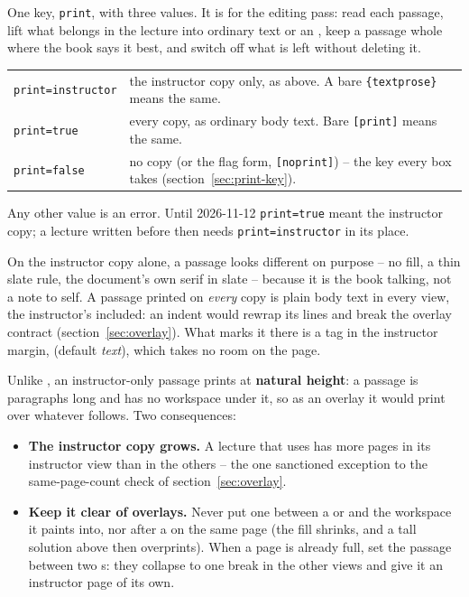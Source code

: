 One key, \texttt{print}, with three values. It is for the editing pass:
read each passage, lift what belongs in the lecture into ordinary text or an
, keep a passage whole where the book says it best, and
switch off what is left without deleting it.

\begin{center}
\begin{tabularx}{\linewidth}{@{}l Y@{}}
\texttt{print=instructor} & the instructor copy only, as above. A bare
  \texttt{\{textprose\}} means the same.\\
\texttt{print=true} & every copy, as ordinary body text. Bare
  \texttt{[print]} means the same.\\
\texttt{print=false} & no copy (or the flag form, \texttt{[noprint]}) -- the
  key every box takes (section~\ref{sec:print-key}).\\
\end{tabularx}
\end{center}

\noindent Any other value is an error. Until 2026-11-12 \texttt{print=true}
meant the instructor copy; a lecture written before then needs
\texttt{print=instructor} in its place.

On the instructor copy alone, a passage looks different on purpose -- no
fill, a thin slate rule, the document's own serif in slate -- because it is
the book talking, not a note to self. A passage printed on \emph{every} copy
is plain body text in every view, the instructor's included: an indent would
rewrap its lines and break the overlay contract (section~\ref{sec:overlay}).
What marks it there is a tag in the instructor margin, 
(default \emph{text}), which takes no room on the page.

Unlike , an instructor-only passage prints at \textbf{natural height}: a passage is
paragraphs long and has no workspace under it, so as an overlay it would print
over whatever follows. Two consequences:

\begin{itemize}
  \item \textbf{The instructor copy grows.} A lecture that uses 
    has more pages in its instructor view than in the others -- the one
    sanctioned exception to the same-page-count check of
    section~\ref{sec:overlay}.
  \item \textbf{Keep it clear of overlays.} Never put one between a
     or  and the workspace it paints into,
    nor after a  on the same page (the fill shrinks, and a tall
    solution above then overprints). When a page is already full, set the
    passage between two s: they collapse to one break in the
    other views and give it an instructor page of its own.
\end{itemize}

